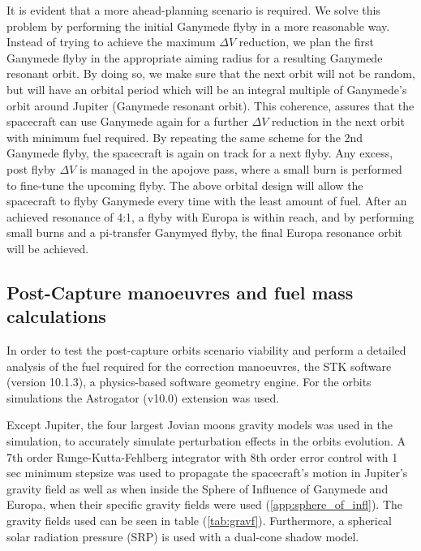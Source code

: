 It is evident that a more ahead-planning scenario is required. We solve this problem by performing the initial Ganymede flyby in a more reasonable way. Instead of trying to achieve the maximum $\Delta V$ reduction, we plan the first Ganymede flyby in the appropriate aiming radius for a resulting Ganymede resonant orbit. By doing so, we make sure that the next orbit will not be random, but will have an orbital period which will be an integral multiple of Ganymede's orbit around Jupiter (Ganymede resonant orbit). This coherence, assures that the spacecraft can use Ganymede again for a further $\Delta V$ reduction in the next orbit with minimum fuel required. By repeating the same scheme for the 2nd Ganymede flyby, the spacecraft is again on track for a next flyby. Any excess, post flyby $\Delta V$ is managed in the apojove pass, where a small burn is performed to fine-tune the upcoming flyby. The above orbital design will allow the spacecraft to flyby Ganymede every time with the least amount of fuel. After an achieved resonance of 4:1, a flyby with Europa is within reach, and by performing small burns and a pi-transfer Ganymyed flyby, the final Europa resonance orbit will be achieved. 
\subsection{Post-Capture manoeuvres and fuel mass calculations}
In order to test the post-capture orbits scenario viability and perform a detailed analysis of the fuel required for the correction manoeuvres, the STK software (version 10.1.3), a physics-based software geometry engine. For the orbits simulations the Astrogator (v10.0) extension was used. 

Except Jupiter, the four largest Jovian moons gravity models was used in the simulation, to accurately simulate perturbation effects in the orbits evolution. A 7th order Runge-Kutta-Fehlberg integrator with 8th order error control with 1 sec minimum stepsize was used to propagate the spacecraft's motion in Jupiter's gravity field as well as when inside the Sphere of Influence of Ganymede and Europa, when their specific gravity fields were used (\ref{app:sphere_of_infl}). The gravity fields used can be seen in table (\ref{tab:gravf}). Furthermore, a spherical solar radiation pressure (SRP) is used with a dual-cone shadow model.

